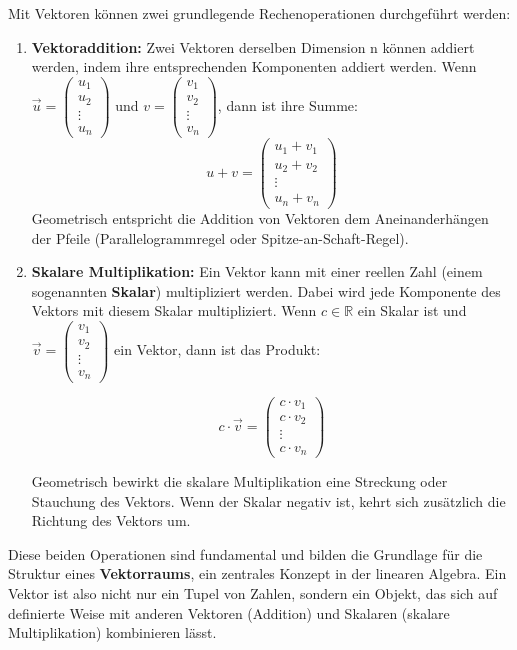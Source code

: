 Mit Vektoren können zwei grundlegende Rechenoperationen durchgeführt werden:
%
\begin{enumerate}
\item \textbf{Vektoraddition:} Zwei Vektoren derselben Dimension n können addiert werden, indem ihre entsprechenden Komponenten addiert werden. Wenn $\vec{u} = \begin{pmatrix}
    u_1 \\ u_2 \\ \vdots \\ u_n
\end{pmatrix}$ und $v = \begin{pmatrix}
    v_1 \\ v_2 \\ \vdots \\ v_n
\end{pmatrix}$, dann ist ihre Summe: 
\[
    u + v = \begin{pmatrix}
        u_1 + v_1 \\ u_2 + v_2 \\ \vdots \\ u_n + v_n
    \end{pmatrix}
\]
Geometrisch entspricht die Addition von Vektoren dem Aneinanderhängen der Pfeile (Parallelogrammregel oder Spitze-an-Schaft-Regel).

\item \textbf{Skalare Multiplikation:} Ein Vektor kann mit einer reellen Zahl (einem sogenannten \textbf{Skalar}) multipliziert werden. Dabei wird jede Komponente des Vektors mit diesem Skalar multipliziert. Wenn $c \in \mathbb{R}$ ein Skalar ist und $\vec{v} = \begin{pmatrix} v_1 \\ v_2 \\ \vdots \\ v_n \end{pmatrix}$ ein Vektor, dann ist das Produkt:

\[
c \cdot \vec{v} = \begin{pmatrix} c \cdot v_1 \\ c \cdot v_2 \\ \vdots \\ c \cdot v_n \end{pmatrix}
\]

Geometrisch bewirkt die skalare Multiplikation eine Streckung oder Stauchung des Vektors. Wenn der Skalar negativ ist, kehrt sich zusätzlich die Richtung des Vektors um.

\end{enumerate}

Diese beiden Operationen sind fundamental und bilden die Grundlage für die Struktur eines \textbf{Vektorraums}, ein zentrales Konzept in der linearen Algebra. Ein Vektor ist also nicht nur ein Tupel von Zahlen, sondern ein Objekt, das sich auf definierte Weise mit anderen Vektoren (Addition) und Skalaren (skalare Multiplikation) kombinieren lässt.